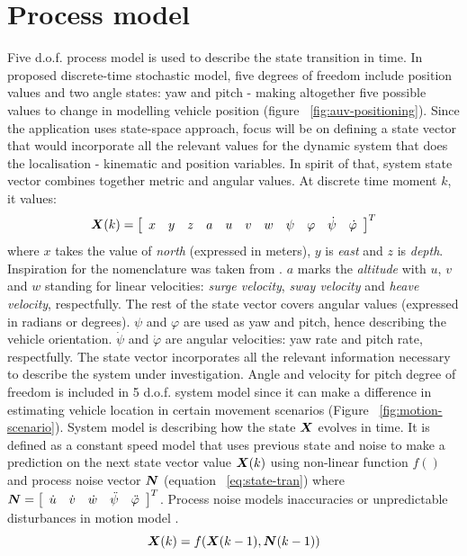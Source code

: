 \section{Process model} \label{sec:system-model}
Five d.o.f. process model is used to describe the state transition in time. In proposed discrete-time stochastic model, five degrees of freedom include position values and two angle states: yaw and pitch - making altogether five possible values to change in modelling vehicle position (figure ~\ref{fig:auv-positioning}). Since the application uses state-space approach, focus will be on defining a state vector that would incorporate all the relevant values for the dynamic system that does the localisation - kinematic and position variables. In spirit of that, system state vector combines together metric and angular values. At discrete time moment $k$, it values:
$$ \boldsymbol{X}(k) = 
\left[ 
\begin{array}{ccccccccccc}
x & y & z & a & u & v & w & \psi & \varphi & \dot{\psi} & \dot{\varphi}
\end{array}
\right] ^{T} $$  
where $x$ takes the value of \textit{north} (expressed in meters), $y$ is \textit{east} and $z$ is \textit{depth}. Inspiration for the nomenclature was taken from \cite{ribas10}. $a$ marks the \textit{altitude} with $u$, $v$ and $w$ standing for linear velocities: \textit{surge velocity}, \textit{sway velocity} and \textit{heave velocity}, respectfully. The rest of the state vector covers angular values (expressed in radians or degrees). $\psi$ and $\varphi$ are used as yaw and pitch, hence describing the vehicle orientation. $\dot{\psi}$ and $\dot{\varphi}$ are angular velocities: yaw rate and pitch rate, respectfully. The state vector incorporates all the relevant information necessary to describe the system under investigation. Angle and velocity for pitch degree of freedom is included in 5 d.o.f. system model since it can make a difference in estimating vehicle location in certain movement scenarios (Figure ~\ref{fig:motion-scenario}). System model is describing how the state $\boldsymbol{X}$ evolves in time. It is defined as a constant speed model that uses previous state and noise to make a prediction on the next state vector value $\boldsymbol{X}(k)$  using non-linear function $f()$ and process noise vector $\boldsymbol{N}$ (equation ~\ref{eq:state-tran}) where $\boldsymbol{N} = \left[ \begin{array}{ccccc} \dot{u} & \dot{v} & \dot{w} & \ddot{\psi} & \ddot{\varphi} \end{array} \right]^{T}$. Process noise models inaccuracies or unpredictable disturbances in motion model \cite{ristic04}. 
\begin{equation}
\boldsymbol{X}(k) = f(\boldsymbol{X}(k-1), \boldsymbol{N}(k-1))
\label{eq:state-tran}
\end{equation}

